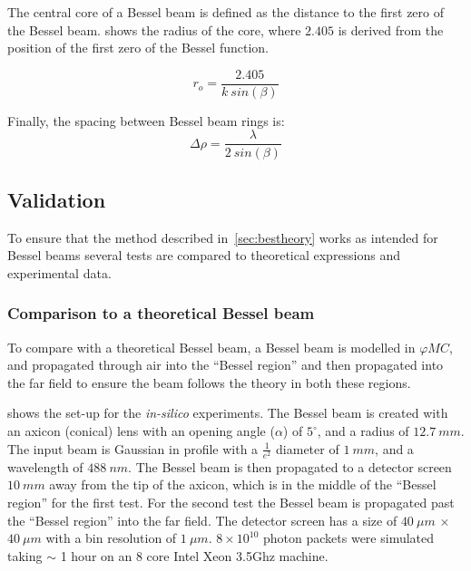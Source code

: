 The central core of a Bessel beam is defined as the distance to the first zero of the Bessel beam.
 shows the radius of the core, where $2.405$ is derived from the position of the first zero of the Bessel function.

\begin{equation}
r_o = \frac{2.405}{k\ sin\left(\beta\right)}
\label{eqn:coreradius}
\end{equation}

Finally, the spacing between Bessel beam rings is:
\begin{equation}
\Delta \rho = \frac{\lambda}{2\ sin\left(\beta\right)}
\end{equation}

\subsection{Validation}

To ensure that the method described in~\cref{sec:bestheory} works as intended for Bessel beams several tests are compared to theoretical expressions and experimental data.

\subsubsection*{Comparison to a theoretical Bessel beam}

To compare with a theoretical Bessel beam, a Bessel beam is modelled in $\varphi MC$, and propagated through air into the ``Bessel region'' and then propagated into the far field to ensure the beam follows the theory in both these regions.

 shows the set-up for the \textit{in-silico} experiments.
The Bessel beam is created with an axicon (conical) lens with an opening angle ($\alpha$) of $5^{\circ}$, and a radius of $12.7~mm$.
The input beam is Gaussian in profile with a $\tfrac{1}{e^2}$ diameter of $1~mm$, and a wavelength of $488~nm$.
The Bessel beam is then propagated to a detector screen $10~mm$ away from the tip of the axicon, which is in the middle of the ``Bessel region'' for the first test.
For the second test the Bessel beam is propagated past the ``Bessel region'' into the far field.
The detector screen has a size of $40~\mu m$ $\times$ $40~\mu m$ with a bin resolution of $1~\mu m$.
$8\times 10^{10}$ photon packets were simulated taking $\sim$ 1 hour on an 8 core Intel Xeon 3.5Ghz machine.

\medskip

